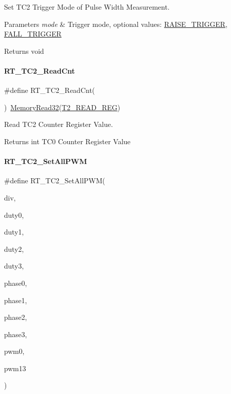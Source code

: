 Set T\+C2 Trigger Mode of Pulse Width Measurement. 


\begin{DoxyParams}{Parameters}
{\em mode} & Trigger mode, optional values\+: \mbox{\hyperlink{a00020_abda90eda34a640b130f48a6ade23fe22}{R\+A\+I\+S\+E\+\_\+\+T\+R\+I\+G\+G\+ER}}, \mbox{\hyperlink{a00020_a9bbaf5b9e2125c7597249c7113b20e6c}{F\+A\+L\+L\+\_\+\+T\+R\+I\+G\+G\+ER}} \\
\hline
\end{DoxyParams}
\begin{DoxyReturn}{Returns}
void 
\end{DoxyReturn}
\mbox{\label{a00047_a6591a513f367f6e7be0a90cb72aa3d49}} 
\paragraph{\texorpdfstring{R\+T\+\_\+\+T\+C2\+\_\+\+Read\+Cnt}{RT\_TC2\_ReadCnt}}
{\footnotesize\ttfamily \#define R\+T\+\_\+\+T\+C2\+\_\+\+Read\+Cnt(\begin{DoxyParamCaption}{ }\end{DoxyParamCaption})~\mbox{\hyperlink{a00020_a2d484dc15bdf30ee11ab3b05f31f0e16}{Memory\+Read32}}(\mbox{\hyperlink{a00020_ac9b4238c1829d1e3414db560a290e861}{T2\+\_\+\+R\+E\+A\+D\+\_\+\+R\+EG}})}



Read T\+C2 Counter Register Value. 

\begin{DoxyReturn}{Returns}
int T\+C0 Counter Register Value 
\end{DoxyReturn}
\mbox{\label{a00047_a49e7120e90142442bdd0744f61b572a5}} 
\paragraph{\texorpdfstring{R\+T\+\_\+\+T\+C2\+\_\+\+Set\+All\+P\+WM}{RT\_TC2\_SetAllPWM}}
{\footnotesize\ttfamily \#define R\+T\+\_\+\+T\+C2\+\_\+\+Set\+All\+P\+WM(\begin{DoxyParamCaption}\item[{}]{div,  }\item[{}]{duty0,  }\item[{}]{duty1,  }\item[{}]{duty2,  }\item[{}]{duty3,  }\item[{}]{phase0,  }\item[{}]{phase1,  }\item[{}]{phase2,  }\item[{}]{phase3,  }\item[{}]{pwm0,  }\item[{}]{pwm13 }\end{DoxyParamCaption})}

